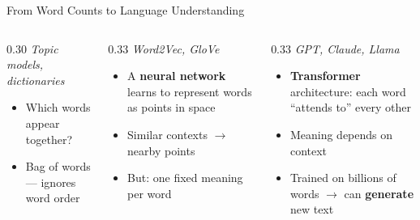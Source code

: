 \documentclass[aspectratio=169]{beamer}
\begin{document}
\begin{frame}{From Word Counts to Language Understanding}
    \small
    \begin{center}
    \end{center}

    \vspace{-0.1cm}
    \begin{columns}[T]
        \begin{column}{0.30\textwidth}
            \footnotesize
            \textit{Topic models, dictionaries}
            \begin{itemize}\setlength\itemsep{0pt}
                \item Which words appear together?
                \item Bag of words --- ignores word order
            \end{itemize}
        \end{column}
        \begin{column}{0.33\textwidth}
            \footnotesize
            \textit{Word2Vec, GloVe}
            \begin{itemize}\setlength\itemsep{0pt}
                \item A \textbf{neural network} learns to represent words as points in space
                \item Similar contexts \(\to\) nearby points
                \item But: one fixed meaning per word
            \end{itemize}
        \end{column}
        \begin{column}{0.33\textwidth}
            \footnotesize
            \textit{GPT, Claude, Llama}
            \begin{itemize}\setlength\itemsep{0pt}
                \item \textbf{Transformer} architecture: each word ``attends to'' every other
                \item Meaning depends on context
                \item Trained on billions of words \(\to\) can \textbf{generate} new text
            \end{itemize}
        \end{column}
    \end{columns}


\end{frame}
\end{document}
